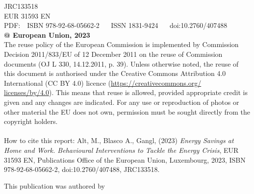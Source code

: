 {\begin{titlepage}
        
        {JRC133518}\\
        {EUR 31593 EN}\\
        
        PDF: \,\, ISBN 978-92-68-05662-2 \,\,\,\,\,\,
        ISSN 1831-9424 \,\,\,\,\,\,
        doi:10.2760/407488\\
        
        \textbf{@ European Union, 2023}\\ 
        
        The reuse policy of the European Commission is implemented by Commission Decision 2011/833/EU of 12 December 2011 on the reuse of Commission documents (OJ L 330, 14.12.2011, p. 39). Unless otherwise noted, the reuse of this document is authorised under the Creative Commons Attribution 4.0 International (CC BY 4.0) licence (\url{https://creativecommons.org/ licenses/by/4.0}). This means that reuse is allowed, provided appropriate credit is given and any changes are indicated. For any use or reproduction of photos or other material the EU does not own, permission must be sought directly from the copyright holders.\\
        \\

        How to cite this report: Alt, M., Blasco A., Gangl, (2023) \emph{Energy Savings at Home and Work. Behavioural Interventions to Tackle the Energy Crisis}, EUR 31593 EN, Publications Office of the European Union, Luxembourg, 2023, ISBN 978-92-68-05662-2, doi:10.2760/407488, JRC133518.

        \clearpage 
        \topskip=120pt
        \begin{center}
            \textbf{\color{blueEC}\Huge\@title}
            \vspace{60pt}
            {\Large\@date}
        \end{center}
    
        \vfill
        This publication was authored by \@author

    \end{titlepage}
}
\makeatother